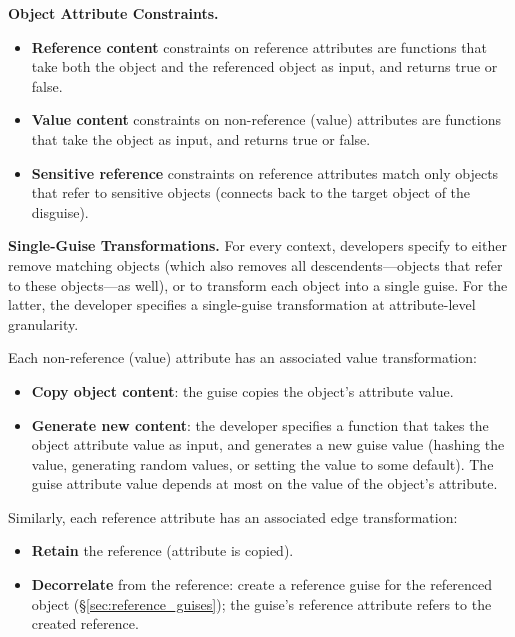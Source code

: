 \vspace{\baselineskip}
\noindent\textbf{Object Attribute Constraints.} 
\begin{itemize}[nosep]
\item \textbf{Reference content} constraints on reference attributes are functions that
    take both the object and the referenced object as input, and returns true or false. 
\item \textbf{Value content} constraints on non-reference (value) attributes are functions that take the object as
input, and returns true or false.  
\item \textbf{Sensitive reference} constraints on reference attributes match only objects that refer
    to sensitive objects (\ie connects back to the target object of the disguise).
\end{itemize}

\vspace{\baselineskip}
\noindent\textbf{Single-Guise Transformations.}
For every context, developers specify to either remove matching objects (which also removes all
descendents---objects that refer to these objects---as well), or to transform each object into
a single guise. For the latter, the developer specifies a single-guise transformation at
attribute-level granularity. 
%

Each non-reference (value) attribute has an associated value transformation:
\begin{itemize}[nosep]
    \item \textbf{Copy object content}: the guise copies the object's attribute value.
    \item \textbf{Generate new content}: the developer specifies a function that takes the object
        attribute value as input, and generates a new guise value (\eg hashing the value, generating
        random values, or setting the value to some default).
        The guise attribute value depends at most on the value of the object's attribute.
\end{itemize}

Similarly, each reference attribute has an associated edge transformation:
\begin{itemize}[nosep]
    \item \textbf{Retain} the reference (attribute is copied).
    \item \textbf{Decorrelate} from the reference: create a reference guise for the referenced
        object (\S\ref{sec:reference_guises}); the guise's reference attribute refers to the
        created reference.
\end{itemize}

